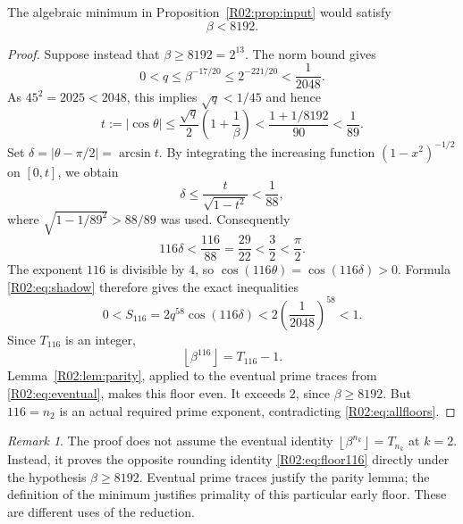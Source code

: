 \documentclass[11pt,a4paper]{article}
\theoremstyle{definition}\newtheorem{definition}[theorem]{Definition}
\theoremstyle{remark}\newtheorem{remark}[theorem]{Remark}
\newcommand{\floor}[1]{\left\lfloor#1\right\rfloor}
\begin{document}
\begin{proposition}\label{R02:prop:bound}
The algebraic minimum in Proposition~\ref{R02:prop:input} would satisfy
\[
 \beta<8192.
\]
\end{proposition}
\begin{proof}
Suppose instead that $\beta\ge8192=2^{13}$. The norm bound gives
\[
 0<q\le\beta^{-17/20}\le2^{-221/20}<\frac1{2048}.
\]
As $45^2=2025<2048$, this implies $\sqrt q<1/45$ and hence
\[
 t:=|\cos\theta|
 \le\frac{\sqrt q}{2}\left(1+\frac1\beta\right)
 <\frac{1+1/8192}{90}<\frac1{89}.
\]
Set $\delta=|\theta-\pi/2|=\arcsin t$. By integrating the increasing
function $(1-x^2)^{-1/2}$ on $[0,t]$, we obtain
\[
 \delta\le\frac{t}{\sqrt{1-t^2}}<\frac1{88},
\]
where $\sqrt{1-1/89^2}>88/89$ was used. Consequently
\[
 116\delta<\frac{116}{88}=\frac{29}{22}<\frac32<\frac\pi2.
\]
The exponent $116$ is divisible by $4$, so
$\cos(116\theta)=\cos(116\delta)>0$. Formula \eqref{R02:eq:shadow}
therefore gives the exact inequalities
\[
 0<S_{116}=2q^{58}\cos(116\delta)<2\left(\frac1{2048}\right)^{58}<1.
\]
Since $T_{116}$ is an integer,
\begin{equation}\label{R02:eq:floor116}
 \floor{\beta^{116}}=T_{116}-1.
\end{equation}
Lemma~\ref{R02:lem:parity}, applied to the eventual prime traces from
\eqref{R02:eq:eventual}, makes this floor even. It exceeds $2$, since
$\beta\ge8192$. But $116=n_2$ is an actual required prime exponent,
contradicting \eqref{R02:eq:allfloors}.
\end{proof}

\begin{remark}
The proof does not assume the eventual identity
$\floor{\beta^{n_k}}=T_{n_k}$ at $k=2$. Instead, it proves the
opposite rounding identity \eqref{R02:eq:floor116} directly under the
hypothesis $\beta\ge8192$. Eventual prime traces justify the parity
lemma; the definition of the minimum justifies primality of this
particular early floor. These are different uses of the reduction.
\end{remark}
\end{document}
